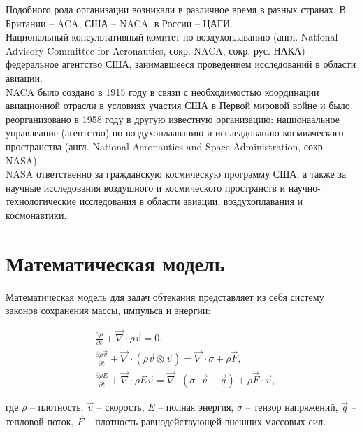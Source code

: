 \documentclass[12pt,a4paper]{article}
\begin{document}
    Подобного рода организации возникали в различное время в разных странах. В Британии -- ACA, США -- NACA, в России -- ЦАГИ.\\

    Национальный консультативный комитет по воздухоплаванию (англ. National Advisory Committee for Aeronautics, сокр. NACA, сокр. рус. НАКА) -- федеральное агентство США, занимавшееся проведением исследований в области авиации.\\

    NACA было создано в 1915 году в связи с необходимостью координации авиационной отрасли в условиях участия США в Первой мировой войне и было реорганизовано в 1958 году в другую известную организацию: национаальное управлеание (агентство) по воздухоплааванию и исслеадованию космиаческого пространства (англ. National Aeronautics and Space Administration, сокр. NASA).\\

    NASA ответственно за гражданскую космическую программу США, а также за научные исследования воздушного и космического пространств и научно-технологические исследования в области авиации, воздухоплавания и космонавтики.\\

    \section*{Математическая модель}

    Математическая модель для задач обтекания представляет из себя систему законов сохранения массы, импульса и энергии:

    \begin{equation}
        \begin{split}
            &\frac{\partial \rho}{\partial t} + \vec{\nabla} \cdot \rho \vec{v} = 0,\\
            &\frac{\partial \rho \vec{v}}{\partial t} + \vec{\nabla} \cdot \left( \rho \vec{v} \otimes \vec{v} \right) = \vec{\nabla} \cdot \sigma + \rho \vec{F},\\
            &\frac{\partial \rho E}{\partial t} + \vec{\nabla} \cdot \rho E \vec{v} = \vec{\nabla} \cdot \left( \sigma \cdot \vec{v} - \vec{q} \right) + \rho \vec{F} \cdot \vec{v},
        \end{split}
        \label{eqn:MME}
    \end{equation}

    \noindent где $\rho$ -- плотность, $\vec{v}$ -- скорость, $E$ -- полная энергия, $\sigma$ -- тензор напряжений, $\vec{q}$ -- тепловой поток, $\vec{F}$ -- плотность равнодействующей внешних массовых сил.\\
\end{document}
